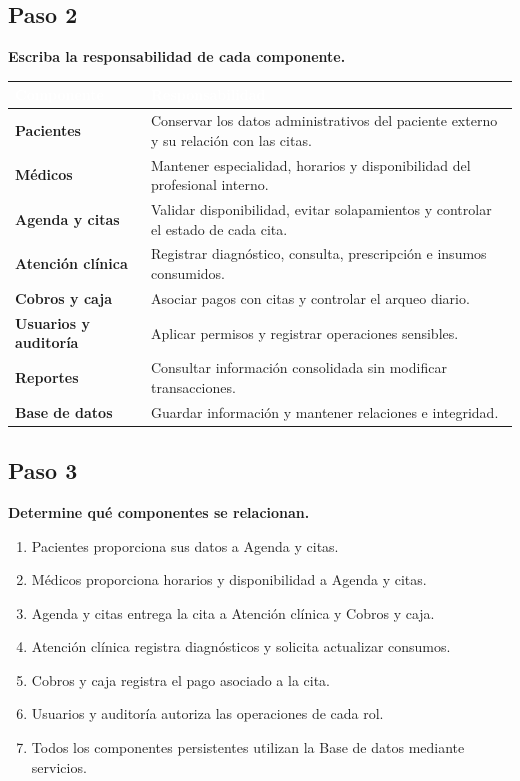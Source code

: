 \subsection*{Paso 2}
\textbf{Escriba la responsabilidad de cada componente.}

\begin{tabularx}{\textwidth}{>{\bfseries}p{}X}
\toprule
\rowcolor{azuloscuro}\textcolor{white}{Componente} & \textcolor{white}{Responsabilidad}\\
\midrule
Pacientes & Conservar los datos administrativos del paciente externo y su relación con las citas.\\
Médicos & Mantener especialidad, horarios y disponibilidad del profesional interno.\\
Agenda y citas & Validar disponibilidad, evitar solapamientos y controlar el estado de cada cita.\\
Atención clínica & Registrar diagnóstico, consulta, prescripción e insumos consumidos.\\
Cobros y caja & Asociar pagos con citas y controlar el arqueo diario.\\
Usuarios y auditoría & Aplicar permisos y registrar operaciones sensibles.\\
Reportes & Consultar información consolidada sin modificar transacciones.\\
Base de datos & Guardar información y mantener relaciones e integridad.\\
\bottomrule
\end{tabularx}

\subsection*{Paso 3}
\textbf{Determine qué componentes se relacionan.}

\begin{enumerate}
    \item Pacientes proporciona sus datos a Agenda y citas.
    \item Médicos proporciona horarios y disponibilidad a Agenda y citas.
    \item Agenda y citas entrega la cita a Atención clínica y Cobros y caja.
    \item Atención clínica registra diagnósticos y solicita actualizar consumos.
    \item Cobros y caja registra el pago asociado a la cita.
    \item Usuarios y auditoría autoriza las operaciones de cada rol.
    \item Todos los componentes persistentes utilizan la Base de datos mediante servicios.
\end{enumerate}

